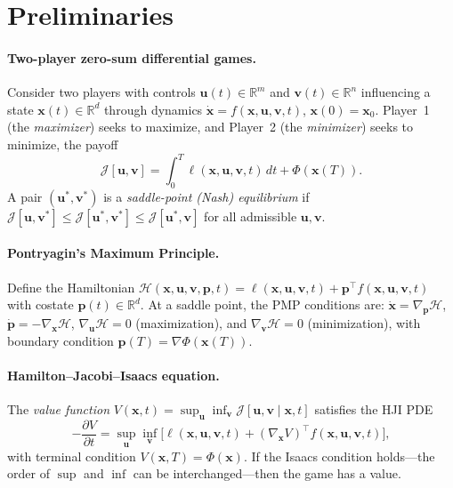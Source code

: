 \documentclass[10pt]{article}
\newcommand{\bu}{\bm{u}}
\newcommand{\bv}{\bm{v}}
\newcommand{\bp}{\bm{p}}
\newcommand{\bx}{\bm{x}}
\newcommand{\cH}{\mathcal{H}}
\newcommand{\cJ}{\mathcal{J}}
\newcommand{\R}{\mathbb{R}}
\newcommand{\pder}[2]{\frac{\partial #1}{\partial #2}}
\begin{document}
\section{Preliminaries}
\label{sec:prelim}

\paragraph{Two-player zero-sum differential games.}
Consider two players with controls $\bu(t) \in \R^m$ and $\bv(t) \in \R^n$ influencing a state $\bx(t) \in \R^d$ through dynamics $\dot{\bx} = f(\bx, \bu, \bv, t)$, $\bx(0) = \bx_0$.
Player~1 (the \emph{maximizer}) seeks to maximize, and Player~2 (the \emph{minimizer}) seeks to minimize, the payoff
\begin{equation}
  \cJ[\bu, \bv] = \int_0^T \ell(\bx, \bu, \bv, t)\,dt + \Phi(\bx(T)).
  \label{eq:payoff}
\end{equation}
A pair $(\bu^*, \bv^*)$ is a \emph{saddle-point (Nash) equilibrium} if $\cJ[\bu, \bv^*] \leq \cJ[\bu^*, \bv^*] \leq \cJ[\bu^*, \bv]$ for all admissible $\bu, \bv$.

\paragraph{Pontryagin's Maximum Principle.}
Define the Hamiltonian $\cH(\bx, \bu, \bv, \bp, t) = \ell(\bx, \bu, \bv, t) + \bp^\top f(\bx, \bu, \bv, t)$ with costate $\bp(t) \in \R^d$.
At a saddle point, the PMP conditions are: $\dot{\bx} = \nabla_{\bp}\cH$, $\dot{\bp} = -\nabla_{\bx}\cH$, $\nabla_{\bu}\cH = 0$ (maximization), and $\nabla_{\bv}\cH = 0$ (minimization), with boundary condition $\bp(T) = \nabla\Phi(\bx(T))$.

\paragraph{Hamilton--Jacobi--Isaacs equation.}
The \emph{value function} $V(\bx, t) = \sup_{\bu}\inf_{\bv}\cJ[\bu, \bv \mid \bx, t]$ satisfies the HJI PDE
\begin{equation}
  -\pder{V}{t} = \sup_{\bu}\inf_{\bv}\bigl[\ell(\bx, \bu, \bv, t) + (\nabla_{\bx}V)^\top f(\bx, \bu, \bv, t)\bigr],
  \label{eq:hji}
\end{equation}
with terminal condition $V(\bx, T) = \Phi(\bx)$.
If the Isaacs condition holds---the order of $\sup$ and $\inf$ can be interchanged---then the game has a value.
\end{document}
